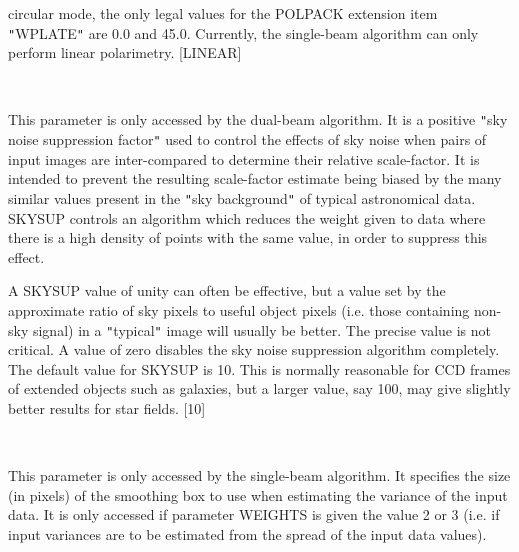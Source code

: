 \documentclass[twoside,11pt]{article}
\renewcommand{\_}{\texttt{\symbol{95}}}
\newcommand{\sstsubsection}[1]{ \item[{#1}] \mbox{} \\}
\newcommand{\sstsubsection}[1]{\item[{#1}]}
\begin{document}
{{{         circular mode, the only legal values for the POLPACK extension
         item {\tt "}WPLATE{\tt "} are 0.0 and 45.0. Currently, the single-beam algorithm
         can only perform linear polarimetry. [LINEAR]
      }
      \sstsubsection{
         SKYSUP = \_REAL (Read)
      }{
         This parameter is only accessed by the dual-beam algorithm. It is
         a positive {\tt "}sky noise suppression factor{\tt "} used to control the
         effects of sky noise when pairs of input images are
         inter-compared to determine their relative scale-factor. It is
         intended to prevent the resulting scale-factor estimate being
         biased by the many similar values present in the {\tt "}sky
         background{\tt "} of typical astronomical data.  SKYSUP controls an
         algorithm which reduces the weight given to data where there
         is a high density of points with the same value, in order to
         suppress this effect.

         A SKYSUP value of unity can often be effective, but a value
         set by the approximate ratio of sky pixels to useful object
         pixels (i.e. those containing non-sky signal) in a {\tt "}typical{\tt "}
         image will usually be better. The precise value
         is not critical. A value of zero disables the sky noise
         suppression algorithm completely. The default value for SKYSUP
         is 10. This is normally reasonable for CCD frames of extended
         objects such as galaxies, but a larger value, say 100, may give
         slightly better results for star fields. [10]
      }
      \sstsubsection{
         SMBOX = \_INTEGER (Read)
      }{
         This parameter is only accessed by the single-beam algorithm. It
         specifies the size (in pixels) of the smoothing box to use
         when estimating the variance of the input data. It is only
         accessed if parameter WEIGHTS is given the value 2 or 3 (i.e. if
         input variances are to be estimated from the spread of the input
         data values).

}}}
\end{document}

